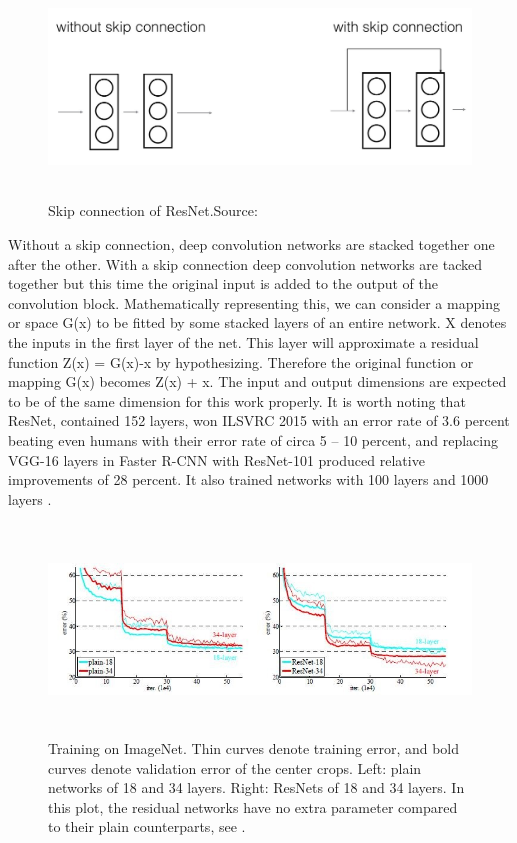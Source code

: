 {\begin{figure}[H]
 \centering
 \includegraphics[height=2.3in]{images/skipconnection.jpg}
 \caption{Skip connection of ResNet.Source:\cite{M}}
\end{figure}

Without a skip connection, deep convolution networks are stacked together one after the other.  With a skip connection deep convolution networks are tacked together but this time the original input is added to the output of the convolution block.
Mathematically representing this, we can consider a mapping or space G(x) to be fitted by some stacked layers of an entire network.  X denotes the inputs in the first layer of the net. This layer will approximate a residual function Z(x) = G(x)-x by hypothesizing.  Therefore the original function or mapping G(x) becomes Z(x) + x.  The input and output dimensions are expected to be of the same dimension for this work properly.  It is worth noting that ResNet, contained 152 layers, won ILSVRC 2015 with an error rate of 3.6 percent beating even humans with their error rate of circa 5 – 10 percent, and replacing VGG-16 layers in Faster R-CNN with ResNet-101 produced relative improvements of 28 percent. It also trained networks with 100 layers and 1000 layers\cite{M} . 

\begin{figure}[H]
  \includegraphics[height=2.2in]{images/resnet-graph.jpg}
   \caption{Training on ImageNet. Thin curves denote training error, and bold curves denote validation error of the center crops. Left: plain networks of 18 and 34 layers. Right: ResNets of 18 and 34 layers. In this plot, the residual networks have no extra parameter compared to their plain counterparts, see \cite{M}.}
\end{figure}

}
